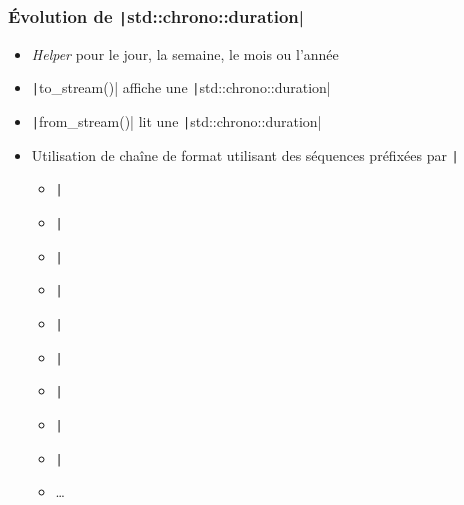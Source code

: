 \documentclass[C++.tex]{subfiles}
\begin{document}
\begin{frame}[fragile]
	\frametitle{Évolution de \texttt|std::chrono::duration|}
	\begin{itemize}
		\item \textit{Helper} pour le jour, la semaine, le mois ou l'année
		\item \texttt|to_stream()| affiche une \texttt|std::chrono::duration|
		\item \texttt|from_stream()| lit une \texttt|std::chrono::duration|
		\item Utilisation de chaîne de format utilisant des séquences préfixées par \texttt|%
		\begin{itemize}
			\item \texttt|%
			\item \texttt|%
			\item \texttt|%
			\item \texttt|%
			\item \texttt|%
			\item \texttt|%
			\item \texttt|%
			\item \texttt|%
			\item \texttt|%
			\item \ldots{}

		\end{itemize}
	\end{itemize}
\end{frame}
\end{document}
